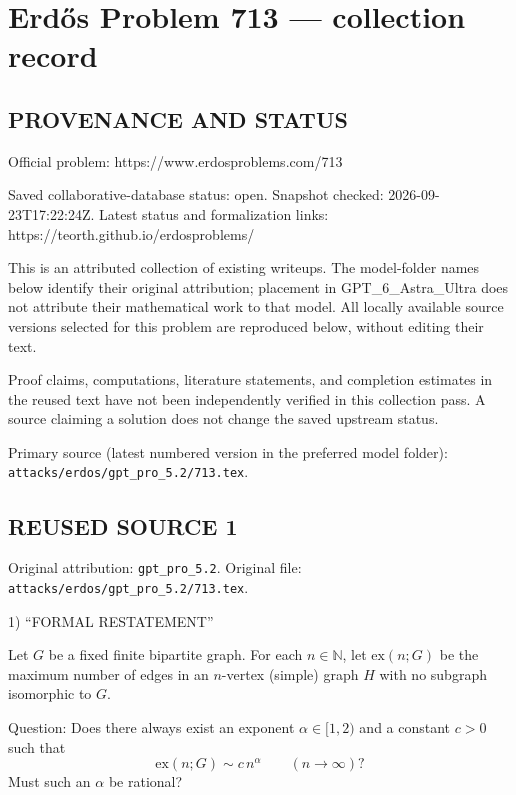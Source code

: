 \section*{Erd\H{o}s Problem 713 --- collection record}

\subsection*{PROVENANCE AND STATUS}
Official problem: https://www.erdosproblems.com/713

Saved collaborative-database status: open.
Snapshot checked: 2026-09-23T17:22:24Z.
Latest status and formalization links: https://teorth.github.io/erdosproblems/

This is an attributed collection of existing writeups. The model-folder names below identify their original attribution; placement in GPT\_6\_Astra\_Ultra does not attribute their mathematical work to that model. All locally available source versions selected for this problem are reproduced below, without editing their text.

Proof claims, computations, literature statements, and completion estimates in the reused text have not been independently verified in this collection pass. A source claiming a solution does not change the saved upstream status.

Primary source (latest numbered version in the preferred model folder): \texttt{attacks/erdos/gpt\_pro\_5.2/713.tex}.

\subsection*{REUSED SOURCE 1}
Original attribution: \texttt{gpt\_pro\_5.2}.
Original file: \texttt{attacks/erdos/gpt\_pro\_5.2/713.tex}.


1) “FORMAL RESTATEMENT”

Let $G$ be a fixed finite bipartite graph. For each $n\in\mathbb N$, let $\mathrm{ex}(n;G)$ be the maximum number of edges in an $n$-vertex (simple) graph $H$ with no subgraph isomorphic to $G$.

Question: Does there always exist an exponent $\alpha\in[1,2)$ and a constant $c>0$ such that
\[
\mathrm{ex}(n;G) \sim c\,n^{\alpha}\qquad (n\to\infty)?
\]
Must such an $\alpha$ be rational?

